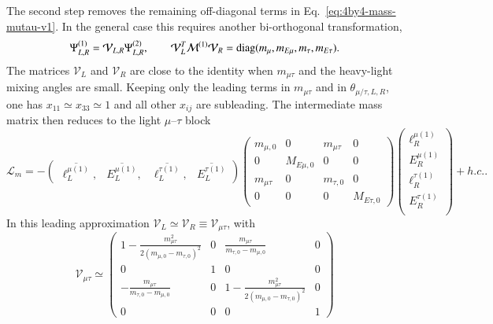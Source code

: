 \documentclass[onecolumn, aps, nofootinbib, prd, preprint, floats, floatfix, amsmath, amssymb, superscriptaddress, preprintnumbers]{revtex4-1}
\begin{document}
The second step removes the remaining off-diagonal terms in Eq.~\eqref{eq:4by4-mass-mutau-v1}. In the general case this requires another bi-orthogonal transformation,
\begin{equation}
\Psi^{(1)}_{L,R}=\mathcal{V}_{L,R}\Psi^{(2)}_{L,R},\qquad
\mathcal{V}_L^T\mathcal{M}^{(1)}\mathcal{V}_R
=
{\rm diag}(m_\mu,m_{E\mu},m_\tau,m_{E\tau}) .
\label{eq:ymutau-second-rotation}
\end{equation}
The matrices \(\mathcal{V}_{L}\) and \(\mathcal{V}_{R}\) are close to the identity when \(m_{\mu\tau}\) and the heavy-light mixing angles are small. Keeping only the leading terms in \(m_{\mu\tau}\) and in \(\theta_{\mu/\tau,L,R}\), one has \(x_{11}\simeq x_{33}\simeq1\) and all other \(x_{ij}\) are subleading. The intermediate mass matrix then reduces to the light \(\mu\)--\(\tau\) block
\begin{equation}
\mathcal{L}_m=-
\begin{pmatrix}
	\overline{\ell^{\mu(1)}_L},  &
	\overline{E^{\mu(1)}_L}, &
	\overline{\ell^{\tau(1)}_L}, &
	\overline{E^{\tau(1)}_L}
\end{pmatrix}
\begin{pmatrix}
	m_{\mu,0} & 0  & m_{\mu\tau} & 0\\
	0 & M_{E\mu,0} & 0 & 0\\
	m_{\mu\tau} & 0 & m_{\tau,0} &0\\
    0 & 0 &  0 & M_{E\tau,0}
\end{pmatrix}
\begin{pmatrix}
	\ell^{\mu(1)}_R \\
	E^{\mu(1)}_R \\
	\ell^{\tau(1)}_R \\
	E^{\tau(1)}_R \\
\end{pmatrix}
+h.c. .
\label{eq:4by4-mass-mutau-lightlimit}
\end{equation}
In this leading approximation \(\mathcal{V}_L\simeq\mathcal{V}_R\equiv\mathcal{V}_{\mu\tau}\), with
\begin{equation}
\mathcal{V}_{\mu\tau} \simeq \begin{pmatrix}
	1-\frac{m_{\mu\tau}^2}{2(m_{\mu,0}-m_{\tau,0})^2} & 0 & \frac{m_{\mu\tau} }{m_{\tau,0}-m_{\mu,0}} & 0 \\
	0 & 1  & 0 & 0\\
	-\frac{m_{\mu\tau} }{m_{\tau,0}-m_{\mu,0}}  & 0  & 1-\frac{m_{\mu\tau}^2}{2(m_{\mu,0}-m_{\tau,0})^2} & 0 \\
	0 & 0 &0 &1
\end{pmatrix}
\label{eq:ymutau-V-leading}
\end{equation}
\end{document}
